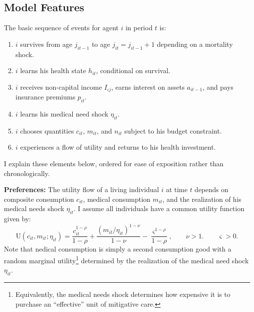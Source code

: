 \documentclass[12pt,pdftex,letterpaper]{article}
\newcommand{\Health}{h}
\newcommand{\Utility}{\text{U}}
\newcommand{\Inc}{I}
\newcommand{\Con}{c}
\newcommand{\Care}{m}
\newcommand{\Invst}{n}
\newcommand{\Assets}{a}
\newcommand{\Premium}{p}
\newcommand{\LifeUtility}{\varsigma}
\newcommand{\CRRAcon}{\rho}
\newcommand{\CRRAcare}{\nu}
\newcommand{\MedShk}{\eta}
\begin{document}
\subsection{Model Features}
\label{sec:ModelSpec}

The basic sequence of events for agent $i$ in period $t$ is:
\begin{enumerate}
\item $i$ survives from age $j_{it-1}$ to age $j_{it} = j_{it-1} + 1$ depending on a mortality shock.

\item $i$ learns his health state $\Health_{it}$, conditional on survival.

\item $i$ receives non-capital income $\Inc_{\iota j}$, earns interest on assets $\Assets_{it-1}$, and pays insurance premiums $\Premium_{it}$.

\item $i$ learns his medical need shock $\MedShk_{it}$.

\item $i$ chooses quantities $\Con_{it}$, $\Care_{it}$, and $\Invst_{it}$ subject to his budget constraint.

\item $i$ experiences a flow of utility and returns to his health investment.
\end{enumerate}
I explain these elements below, ordered for ease of exposition rather than chronologically.

\vspace{0.5cm}

\noindent \textbf{Preferences:} The utility flow of a living individual $i$ at time $t$ depends on composite consumption $\Con_{it}$, medical consumption $\Care_{it}$, and the realization of his medical needs shock $\MedShk_{it}$.  I assume all individuals have a common utility function given by:
\begin{equation}\label{Utility}
\Utility(\Con_{it},\Care_{it};\MedShk_{it}) = \frac{\Con_{it}^{1 - \CRRAcon}}{1 - \CRRAcon} + \frac{(\Care_{it}/\MedShk_{it})^{1 - \CRRAcare}}{1 - \CRRAcare} - \frac{\LifeUtility^{1 - \CRRAcon}}{1 - \CRRAcon}, \qquad \CRRAcare > 1. \qquad \LifeUtility > 0.
\end{equation}
Note that nedical consumption is simply a second consumption good with a random marginal utility\footnote{Equivalently, the medical needs shock determines how expensive it is to purchase an ``effective'' unit of mitigative care.} determined by the realization of the medical need shock $\MedShk_{it}$. 
\end{document}
